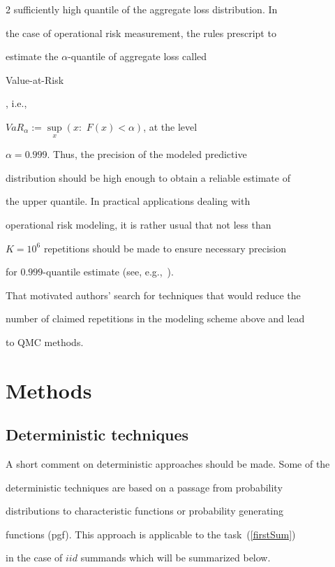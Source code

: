 \begin{multicols}{2}
sufficiently high quantile of the aggregate loss distribution. In

the case of operational risk measurement, the rules prescript to

estimate the $\alpha$-quantile of aggregate loss called {\it

Value-at-Risk}, i.e.,

$VaR_{\alpha}:=\sup\limits_x(x:\,\,F(x)<\alpha)$, at the level

$\alpha=0.999$. Thus, the precision of the modeled predictive

distribution should be high enough to obtain a reliable estimate of

the upper quantile. In practical applications dealing with

operational risk modeling, it is rather usual that not less than

$K=10^6$ repetitions should be made to ensure necessary precision

for $0.999$-quantile estimate (see, e.g.,~\cite{Shev4, TW}).





That motivated authors' search for techniques that would reduce the

number of claimed repetitions in the modeling scheme above and lead

to QMC methods.





\section{Methods}



\subsection{Deterministic techniques}



\noindent

A short comment on deterministic approaches should be made. Some of the

deterministic techniques are based on a passage from probability

distributions to characteristic functions or probability generating

functions (pgf). This approach is applicable to the task~(\ref{firstSum})

in the case of $iid$ summands which will be summarized below.




\end{multicols}
